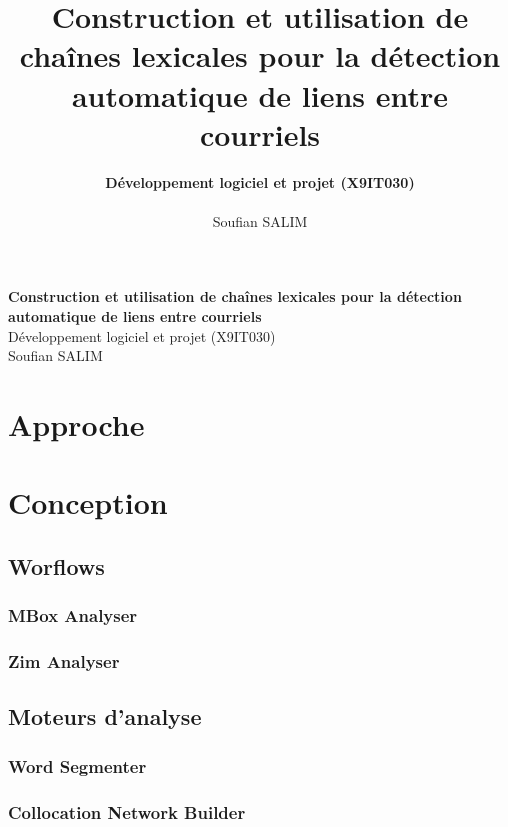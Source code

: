 \documentclass[a4paper]{article}
\title{\bf Construction et utilisation de chaînes lexicales pour la détection automatique de liens entre courriels}
\author{
    \textbf{Développement logiciel et projet (X9IT030)} \\
    \\
    Soufian SALIM
}
\begin{document}
\begin{titlepage}
	\vspace*{\fill}
	
	\begin{center}
		{\Large \bf Construction et utilisation de chaînes lexicales pour la détection automatique de liens entre courriels}\\[0.8cm]
		{\Large Développement logiciel et projet (X9IT030)}\\[0.8cm]
		{Soufian SALIM}\\[0.8cm]
	\end{center}
	
	\vspace*{\fill}
\end{titlepage}

\newpage

\tableofcontents

\newpage

\section{Approche}

\section{Conception}

	\subsection{Worflows}

	\subsubsection{MBox Analyser}

	\subsubsection{Zim Analyser}

	\subsection{Moteurs d'analyse}

	\subsubsection{Word Segmenter}

	\subsubsection{Collocation Network Builder}
\end{document}
